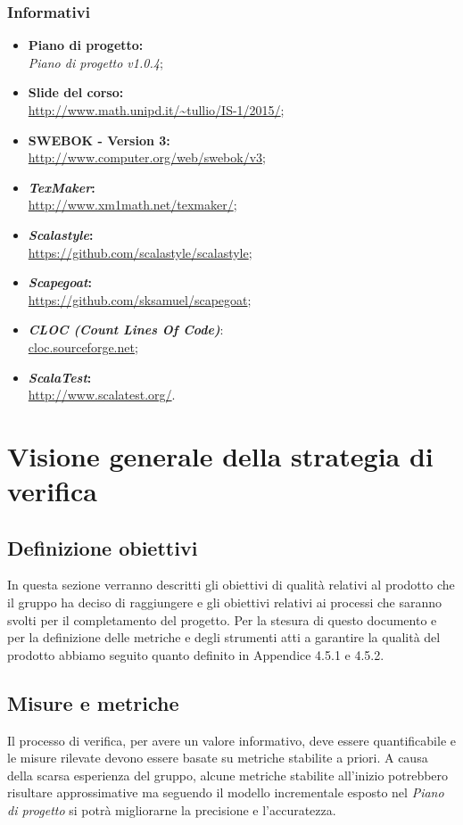 \documentclass[a4paper]{article}
\begin{document}
			\subsubsection{Informativi}
				\begin{itemize}
					\item \textbf{Piano di progetto:} \\ \emph{Piano di progetto v1.0.4};
					\item \textbf{Slide del corso:} \\ \url{http://www.math.unipd.it/~tullio/IS-1/2015/};
					\item \textbf{SWEBOK - Version 3:} \\ \url{http://www.computer.org/web/swebok/v3};
					\item \textbf{\emph{TexMaker}:}\\ \url{http://www.xm1math.net/texmaker/};
				    \item \textbf{\emph{Scalastyle}:}\\ \url{https://github.com/scalastyle/scalastyle};
					\item \textbf{\emph{Scapegoat}:}\\ \url{https://github.com/sksamuel/scapegoat};
					\item \textbf{\emph{CLOC (Count Lines Of Code)}}:\\ \url{cloc.sourceforge.net};
					\item \textbf{\emph{ScalaTest}:}\\ \url{http://www.scalatest.org/}.
				\end{itemize}
	\section{Visione generale della strategia di verifica}
		
			\subsection{Definizione obiettivi}
			In questa sezione verranno descritti gli obiettivi di qualità relativi al prodotto che il 
			gruppo ha deciso di raggiungere e gli obiettivi relativi ai processi che saranno svolti per 
			il completamento del progetto.
			Per la stesura di questo documento e per la definizione delle metriche e degli strumenti atti a garantire la qualità del prodotto abbiamo seguito quanto definito in Appendice 4.5.1 e 4.5.2. 
	
\subsection{Misure e metriche}
			 Il processo di verifica, per avere un valore informativo, deve essere quantificabile e le misure rilevate
 devono essere basate su metriche stabilite a priori. 
 A causa della scarsa esperienza del gruppo, alcune metriche stabilite all'inizio potrebbero risultare approssimative ma
 seguendo il modello incrementale esposto nel \emph{Piano di progetto} si potrà migliorarne la precisione e l'accuratezza.
\end{document}
